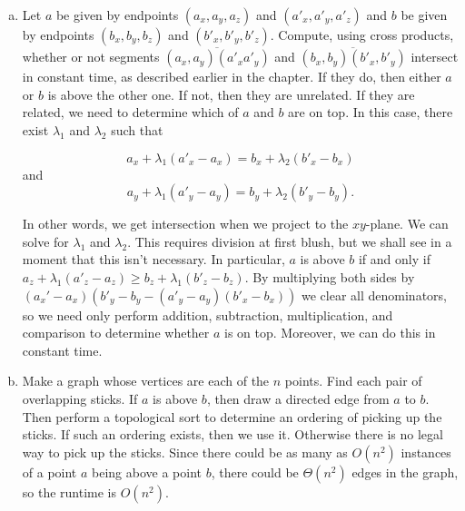 \documentclass{article}
\begin{document}
\begin{enumerate}[a.]
\item Let $a$ be given by endpoints $(a_x, a_y, a_z)$ and $(a'_x, a'_y, a'_z)$ and $b$ be given by endpoints $(b_x,b_y,b_z)$ and $(b'_x,b'_y,b'_z)$.   Compute, using cross products, whether or not segments $\overline{(a_x,a_y)(a'_xa'_y)}$ and $\overline{(b_x,b_y)(b'_x,b'_y)}$ intersect in constant time, as described earlier in the chapter.  If they do, then either $a$ or $b$ is above the other one.  If not, then they are unrelated.  If they are related, we need to determine which of $a$ and $b$ are on top.  In this case, there exist $\lambda_1$ and $\lambda_2$ such that 

\[ a_x + \lambda_1(a'_x - a_x) = b_x + \lambda_2(b'_x - b_x)\]
and
\[ a_y + \lambda_1(a'_y-a_y) = b_y + \lambda_2(b'_y-b_y).\]

In other words, we get intersection when we project to the $xy$-plane.  We can solve for $\lambda_1$ and $\lambda_2$.  This requires division at first blush, but we shall see in a moment that this isn't necessary.  In particular, $a$ is above $b$ if and only if $a_z + \lambda_1(a'_z - a_z) \geq b_z + \lambda_1(b'_z-b_z)$.  By multiplying both sides by $(a_x'-a_x)(b'_y-b_y - (a'_y-a_y)(b'_x-b_x))$ we clear all denominators, so we need only perform addition, subtraction, multiplication, and comparison to determine whether $a$ is on top.  Moreover, we can do this in constant time. 

\item Make a graph whose vertices are each of the $n$ points.  Find each pair of overlapping sticks.  If $a$ is above $b$, then draw a directed edge from $a$ to $b$.   Then perform a topological sort to determine an ordering of picking up the sticks.  If such an ordering exists, then we use it.  Otherwise there is no legal way to pick up the sticks.  Since there could be as many as $O(n^2)$ instances of a point $a$ being above a point $b$, there could be $\Theta(n^2)$ edges in the graph, so the runtime is $O(n^2)$. 
\end{enumerate}
\end{document}
